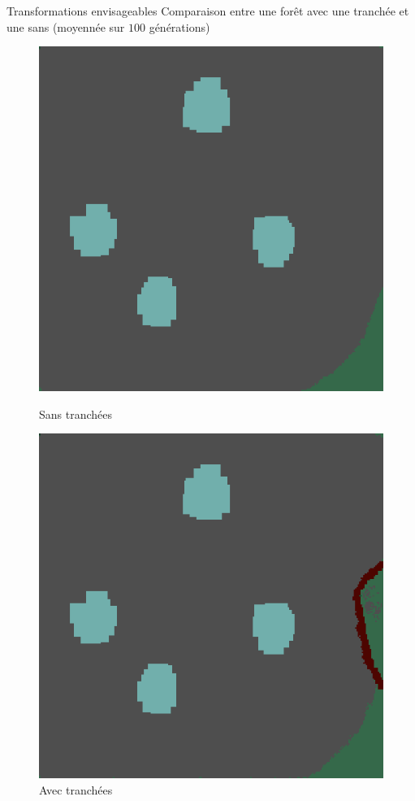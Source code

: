 \documentclass{beamer}
\begin{document}
\begin{frame}{Transformations envisageables \hyperlink{jump}{\beamerbutton{ }} \hypertarget{13}{\beamerbutton{ }}}
    Comparaison entre une forêt avec une tranchée et une sans (moyennée sur $100$ générations)
    
    \begin{figure}[!htb]
        \begin{minipage}{0.48\textwidth}
          \centering
          \includegraphics[width=.8\linewidth]{pictures/trans/no_treach.png}
          \caption{Sans tranchées}\label{Fig:Data1}
        \end{minipage}\hfill
        \begin{minipage}{0.48\textwidth}
          \centering
          \includegraphics[width=.8\linewidth]{pictures/trans/treach.png}
          \caption{Avec tranchées}\label{Fig:Data2}
        \end{minipage}
     \end{figure}
\end{frame}
\end{document}
